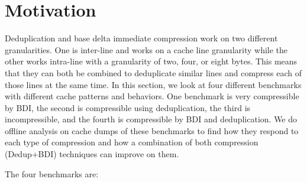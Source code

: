 \section{Motivation}
\label{sec:Motivation}
Deduplication and base delta immediate compression work on two different granularities. One is inter-line and works on a cache line granularity while the other works intra-line with a granularity of two, four, or eight bytes. This means that they can both be combined to deduplicate similar lines and compress each of those lines at the same time.
In this section, we look at four different benchmarks with different cache patterns and behaviors. One benchmark is very compressible by BDI, the second is compressible using deduplication, the third is incompressible, and the fourth is compressible by BDI and deduplication. We do offline analysis on cache dumps of these benchmarks to find how they respond to each type of compression and how a combination of both compression (Dedup+BDI) techniques can improve on them.\par
The four benchmarks are:
